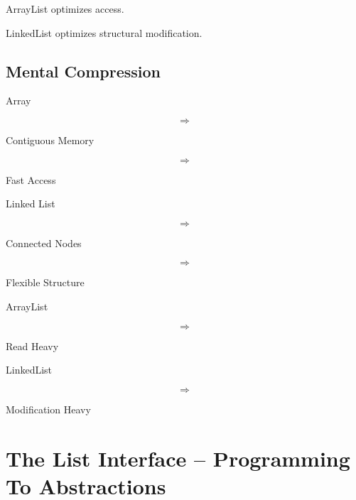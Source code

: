\documentclass[11pt,a4paper]{book}
\begin{document}

\begin{rosettarule}

ArrayList optimizes access.

\end{rosettarule}


\begin{rosettarule}

LinkedList optimizes structural
modification.

\end{rosettarule}


\section{Mental Compression}

Array

\[
\Rightarrow
\]

Contiguous Memory

\[
\Rightarrow
\]

Fast Access


Linked List

\[
\Rightarrow
\]

Connected Nodes

\[
\Rightarrow
\]

Flexible Structure


ArrayList

\[
\Rightarrow
\]

Read Heavy


LinkedList

\[
\Rightarrow
\]

Modification Heavy
\chapter{The List Interface -- Programming To Abstractions}
\end{document}
